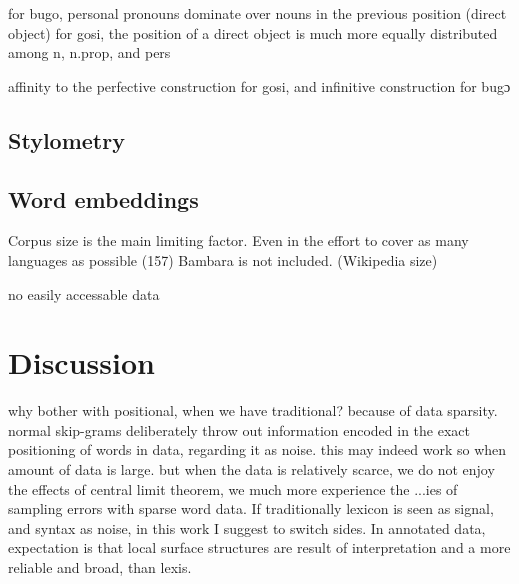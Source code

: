 \documentclass[12pt]{article}
\begin{document}
for bugo, personal pronouns dominate over nouns in the previous
position (direct object) 
for gosi, the position of a direct object is much more equally distributed among n, n.prop, and pers

affinity to the perfective construction for gosi, and infinitive
construction for bugɔ




\subsection{Stylometry}





\subsection{Word embeddings}

Corpus size is the main limiting factor. Even in the effort to cover
as many languages as possible (157) Bambara is not
included. (Wikipedia size)


no easily accessable data 

\section{Discussion}

why bother with positional, when we have traditional?  because of data
sparsity. normal skip-grams deliberately throw out information encoded
in the exact positioning of words in data, regarding it as noise. this
may indeed work so when amount of data is large. but when the data is
relatively scarce, we do not enjoy the effects of central limit
theorem, we much more experience the ...ies of sampling errors with
sparse word data. If traditionally lexicon is seen as signal, and
syntax as noise, in this work I suggest to switch sides. In annotated
data, expectation is that local surface structures are result of
interpretation and a more reliable and broad, than lexis. 
\end{document}
